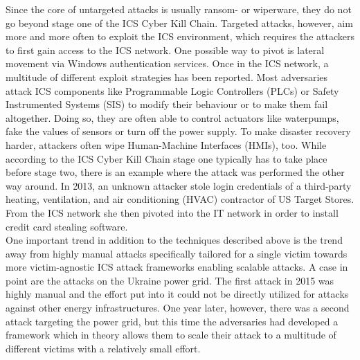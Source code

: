 \documentclass[runningheads]{llncs}
\begin{document}
Since the core of untargeted attacks is usually ransom- or wiperware, they do not go beyond stage one of the ICS Cyber Kill Chain.
Targeted attacks, however, aim more and more often to exploit the ICS environment, which requires the attackers to first gain access to the ICS network.
One possible way to pivot is lateral movement via Windows authentication services.
Once in the ICS network, a multitude of different exploit strategies has been reported.
Most adversaries attack ICS components like Programmable Logic Controllers (PLCs) or Safety Instrumented Systems (SIS) to modify their behaviour or to make them fail altogether.
Doing so, they are often able to control actuators like waterpumps, fake the values of sensors or turn off the power supply.
To make disaster recovery harder, attackers often wipe Human-Machine Interfaces (HMIs), too.
While according to the ICS Cyber Kill Chain stage one typically has to take place before stage two, there is an example where the attack was performed the other way around.
In 2013, an unknown attacker stole login credentials of a third-party heating, ventilation, and air conditioning (HVAC) contractor of US Target Stores.
From the ICS network she then pivoted into the IT network in order to install credit card stealing software. \cite{hemsley.18}\\
One important trend in addition to the techniques described above is the trend away from highly manual attacks specifically tailored for a single victim towards more victim-agnostic ICS attack frameworks enabling scalable attacks.
A case in point are the attacks on the Ukraine power grid.
The first attack in 2015 was highly manual and the effort put into it could not be directly utilized for attacks against other energy infrastructures.
One year later, however, there was a second attack targeting the power grid, but this time the adversaries had developed a framework which in theory allows them to scale their attack to a multitude of different victims with a relatively small effort. \cite{greenberg.17}
\end{document}

